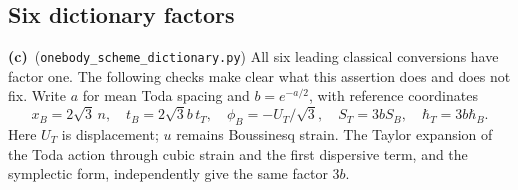 \documentclass[11pt,a4paper]{article}
\newcommand{\Lc}{\textbf{(c)}\ }
\newcommand{\dcheck}{\texttt{onebody\_\allowbreak scheme\_\allowbreak dictionary.py}}
\begin{document}
\subsection{Six dictionary factors}
\Lc (\dcheck) All six leading classical conversions have factor one.
The following checks make clear what this assertion does and does not fix.
Write $a$ for mean Toda spacing and $b=e^{-a/2}$, with reference coordinates
\begin{equation}\label{eq:dictionary}
 x_B=2\sqrt3\,n,\quad t_B=2\sqrt3 b\,t_T,
 \quad \phi_B=-U_T/\sqrt3,\quad
 S_T=3bS_B,\quad \hbar_T=3b\hbar_B.
\end{equation}
Here $U_T$ is displacement; $u$ remains Boussinesq strain. The Taylor
expansion of the Toda action through cubic strain and the first dispersive
term, and the symplectic form, independently give the same factor $3b$.
\end{document}

